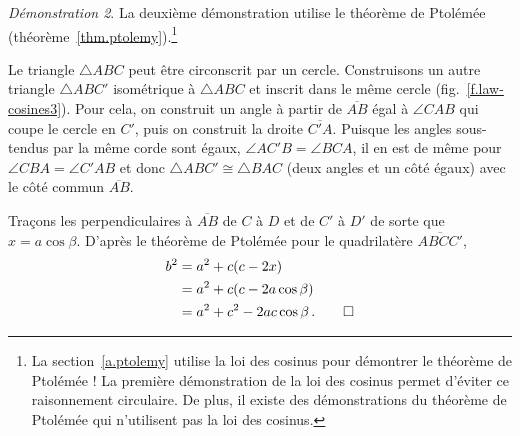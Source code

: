 \noindent \emph{Démonstration 2}.
La deuxième démonstration utilise le théorème de Ptolémée  (théorème~\ref{thm.ptolemy}).\footnote{La section~\ref{a.ptolemy} utilise la loi des cosinus pour démontrer le théorème de Ptolémée ! La première démonstration de la loi des cosinus permet d'éviter ce raisonnement circulaire. De plus, il existe des démonstrations du théorème de Ptolémée qui n'utilisent pas la loi des cosinus.}

Le triangle $\triangle ABC$ peut être circonscrit par un cercle. 
Construisons un autre triangle $\triangle ABC'$ isométrique à $\triangle ABC$ et inscrit dans le même cercle (fig.~\ref{f.law-cosines3}). Pour cela, on construit un angle à partir de $\overline{AB}$ égal à $\angle CAB$ qui coupe le cercle en $C'$, puis on construit la droite $\overline{C'A}$.
Puisque les angles sous-tendus par la même corde sont égaux, $\angle AC'B =\angle BCA$, il en est de même pour $\angle CBA=\angle C'AB$ et donc $\triangle ABC'\cong \triangle BAC$ (deux angles et un côté égaux) avec le côté commun $\overline{AB}$.

Traçons les perpendiculaires à $\overline{AB}$ de $C$ à $D$ et de $C'$ à $D'$ de sorte que $x=a\cos \beta$. D'après le théorème de Ptolémée pour le quadrilatère $\overline{ABCC'}$,
\begin{align*}
b^2&=a^2+c(c-2x)\\
&= a^2 + c(c-2a\cos\beta)\\
&=a^2+c^2-2ac\cos\beta\,.\qedhere
\end{align*}


